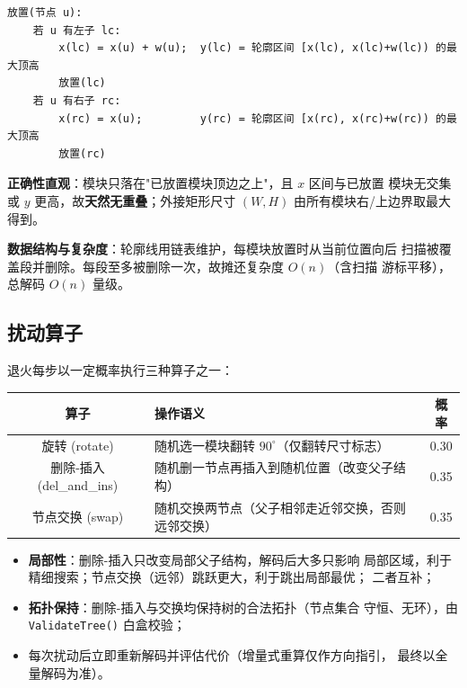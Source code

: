\documentclass[12pt,a4paper]{article}
\begin{document}
\begin{tcolorbox}[colback=gray!8, colframe=gray!60, title=伪代码]
{\footnotesize
\begin{verbatim}
放置(节点 u):
    若 u 有左子 lc:
        x(lc) = x(u) + w(u);  y(lc) = 轮廓区间 [x(lc), x(lc)+w(lc)) 的最大顶高
        放置(lc)
    若 u 有右子 rc:
        x(rc) = x(u);         y(rc) = 轮廓区间 [x(rc), x(rc)+w(rc)) 的最大顶高
        放置(rc)
\end{verbatim}
}
\end{tcolorbox}

\textbf{正确性直观}：模块只落在"已放置模块顶边之上"，且 $x$ 区间与已放置
模块无交集或 $y$ 更高，故\textbf{天然无重叠}；外接矩形尺寸
$(W, H)$ 由所有模块右/上边界取最大得到。

\textbf{数据结构与复杂度}：轮廓线用链表维护，每模块放置时从当前位置向后
扫描被覆盖段并删除。每段至多被删除一次，故摊还复杂度 $O(n)$（含扫描
游标平移），总解码 $O(n)$ 量级。

\subsection{扰动算子}

退火每步以一定概率执行三种算子之一：

\begin{table}[H]
\centering
\small
\begin{tabular}{clc}
\toprule
算子 & 操作语义 & 概率 \\
\midrule
旋转 (rotate) & 随机选一模块翻转 $90^\circ$（仅翻转尺寸标志） & 0.30 \\
删除-插入 (del\_and\_ins) & 随机删一节点再插入到随机位置（改变父子结构） & 0.35 \\
节点交换 (swap) & 随机交换两节点（父子相邻走近邻交换，否则远邻交换） & 0.35 \\
\bottomrule
\end{tabular}
\end{table}

\begin{itemize}
    \item \textbf{局部性}：删除-插入只改变局部父子结构，解码后大多只影响
    局部区域，利于精细搜索；节点交换（远邻）跳跃更大，利于跳出局部最优；
    二者互补；
    \item \textbf{拓扑保持}：删除-插入与交换均保持树的合法拓扑（节点集合
    守恒、无环），由 \texttt{ValidateTree()} 白盒校验；
    \item 每次扰动后立即重新解码并评估代价（增量式重算仅作方向指引，
    最终以全量解码为准）。
\end{itemize}
\end{document}
